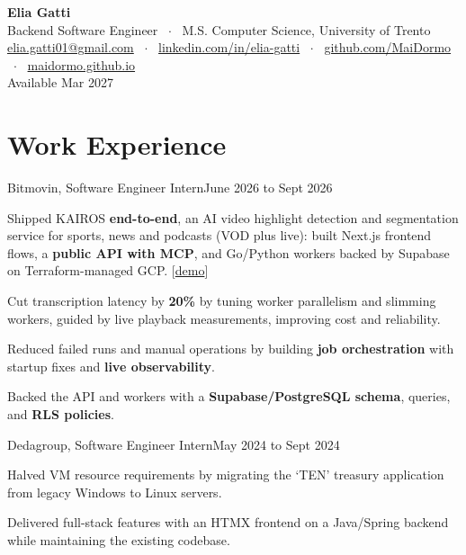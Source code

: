 


\pagestyle{empty}
\color{maintext}

\begin{center}
{\Huge\textbf{Elia Gatti}} \\[6pt]
{\large Backend Software Engineer \ $\cdot$ \ M.S. Computer Science, University of Trento} \\[5pt]
\href{mailto:elia.gatti01@gmail.com}{elia.gatti01@gmail.com} \ $\cdot$ \
\href{https://www.linkedin.com/in/elia-gatti/}{linkedin.com/in/elia-gatti} \ $\cdot$ \
\href{https://github.com/MaiDormo}{github.com/MaiDormo} \ $\cdot$ \
\href{https://maidormo.github.io/}{maidormo.github.io} \\[3pt]
{\small Available Mar 2027}
\end{center}

\section{Work Experience}
\begin{joblong}{Bitmovin, Software Engineer Intern}{June 2026 to Sept 2026}
    \item Shipped KAIROS \textbf{end-to-end}, an AI video highlight detection and segmentation service for sports, news and podcasts (VOD plus live): built Next.js frontend flows, a \textbf{public API with MCP}, and Go/Python workers backed by Supabase on Terraform-managed GCP. [\href{https://kairosapp.tech}{demo}]
    \item Cut transcription latency by \textbf{20\%} by tuning worker parallelism and slimming workers, guided by live playback measurements, improving cost and reliability.
    \item Reduced failed runs and manual operations by building \textbf{job orchestration} with startup fixes and \textbf{live observability}.
    \item Backed the API and workers with a \textbf{Supabase/PostgreSQL schema}, queries, and \textbf{RLS policies}.
\end{joblong}

\vspace{4pt}

\begin{joblong}{Dedagroup, Software Engineer Intern}{May 2024 to Sept 2024}
    \item Halved VM resource requirements by migrating the `TEN' treasury application from legacy Windows to Linux servers.
    \item Delivered full-stack features with an HTMX frontend on a Java/Spring backend while maintaining the existing codebase.
\end{joblong}

